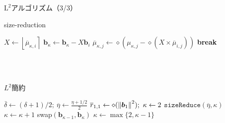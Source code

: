 \documentclass[12pt,aspectratio=169,table,dvipdfmx, leqno]{beamer}
\newcommand{\round}[1]{\left\lfloor #1 \right\rceil}
\begin{document}
\begin{frame}{$\text{L}^2$アルゴリズム（3/3）}
\begin{minipage}[b]{0.45\columnwidth}
\begin{algorithm}[H]
    \footnotesize
    \begin{algorithmic}[1]
        \caption{\footnotesize size-reduction\cite{Stehle10}}
        \label{alg_L2_2}
            \Loop
                        \State $X\gets \round{\overline{\mu}_{\kappa, i}}$
                        \State $\bm{b}_\kappa\gets\bm{b}_\kappa-X\bm{b}_i$
                            \State $\overline{\mu}_{\kappa, j}\gets\diamond(\mu_{\kappa, j}-\diamond(X\times \overline{\mu}_{i, j}))$
                        \EndFor
                    \EndFor
                \Else
                    \State \textbf{break}
                \EndIf
            \EndLoop
    \end{algorithmic}
\end{algorithm}
\mbox{}\\
\mbox{}\\
\end{minipage}
\hspace{0.03\columnwidth} %
\begin{minipage}[b]{0.45\columnwidth}
\begin{algorithm}[H]
    \footnotesize
    \begin{algorithmic}[1]
        \caption{\footnotesize $L^2$簡約\cite{Stehle10}}
        \label{alg_L2_2}
        \State $\overline{\delta}\gets(\delta+1)/2;~\overline{\eta}\gets\frac{\eta+1/2}{2}$
        \State $\overline{r}_{1,1}\gets\diamond(\norm{\bm{b}_1}^2);~\kappa\gets 2$
            \State $\texttt{sizeReduce}(\overline{\eta}, \kappa)$
                \State $\kappa\gets\kappa+1$
            \Else
                \State swap$(\bm{b}_{\kappa-1}, \bm{b}_\kappa)$
                \State $\kappa\gets \max\{2, \kappa-1\}$
            \EndIf
        \EndWhile
    \end{algorithmic}
\end{algorithm}
    \mbox{}\\
\end{minipage}
\end{frame}
\fi
\end{document}
